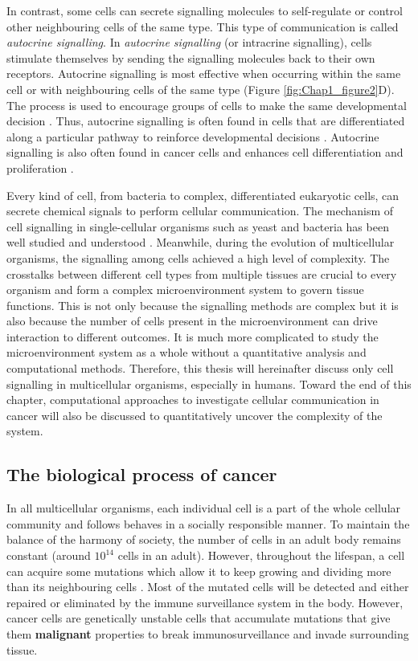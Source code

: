 In contrast, some cells can secrete signalling molecules to self-regulate or control other neighbouring cells of the same type. This type of communication is called \textit{autocrine signalling}. In \textit{autocrine signalling} (or intracrine signalling), cells stimulate themselves by sending the signalling molecules back to their own receptors. Autocrine signalling is most effective when occurring within the same cell or with neighbouring cells of the same type (Figure \ref{fig:Chap1_figure2}D). The process is used to encourage groups of cells to make the same developmental decision \cite{armingol2021deciphering, alberts2018molecular}. Thus, autocrine signalling is often found in cells that are differentiated along a particular pathway to reinforce developmental decisions \cite{alberts2018molecular}. Autocrine signalling is also often found in cancer cells and enhances cell differentiation and proliferation \cite{sporn1985autocrine}.  

Every kind of cell, from bacteria to complex, differentiated eukaryotic cells, can secrete chemical signals to perform cellular communication. The mechanism of cell signalling in single-cellular organisms such as yeast and bacteria has been well studied and understood \cite{alberts2018molecular}. Meanwhile, during the evolution of multicellular organisms, the signalling among cells achieved a high level of complexity. The crosstalks between different cell types from multiple tissues are crucial to every organism and form a complex microenvironment system to govern tissue functions. This is not only because the signalling methods are complex but it is also because the number of cells present in the microenvironment can drive interaction to different outcomes. It is much more complicated to study the microenvironment system as a whole without a quantitative analysis and computational methods. Therefore, this thesis will hereinafter discuss only cell signalling in multicellular organisms, especially in humans. Toward the end of this chapter, computational approaches to investigate cellular communication in cancer will also be discussed to quantitatively uncover the complexity of the system. 

\subsection{The biological process of cancer}
In all multicellular organisms, each individual cell is a part of the whole cellular community and follows behaves in a socially responsible manner. To maintain the balance of the harmony of society, the number of cells in an adult body remains constant (around $10^{14}$ cells in an adult). However, throughout the lifespan, a cell can acquire some mutations which allow it to keep growing and dividing more than its neighbouring cells \cite{alberts2018molecular, greaves2012clonal}. Most of the mutated cells will be detected and either repaired or eliminated by the immune surveillance system in the body. However, cancer cells are genetically unstable cells that accumulate mutations that give them \textbf{malignant} properties to break immunosurveillance and invade surrounding tissue. 

